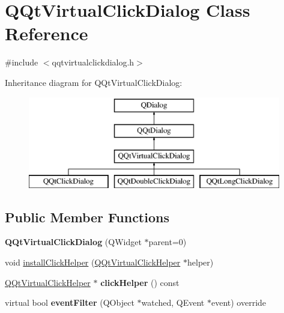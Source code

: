 \hypertarget{class_q_qt_virtual_click_dialog}{}\section{Q\+Qt\+Virtual\+Click\+Dialog Class Reference}
\label{class_q_qt_virtual_click_dialog}


{\ttfamily \#include $<$qqtvirtualclickdialog.\+h$>$}

Inheritance diagram for Q\+Qt\+Virtual\+Click\+Dialog\+:\begin{figure}[H]
\begin{center}
\leavevmode
\includegraphics[height=4.000000cm]{class_q_qt_virtual_click_dialog}
\end{center}
\end{figure}
\subsection*{Public Member Functions}
\begin{DoxyCompactItemize}
\item 
\mbox{\label{class_q_qt_virtual_click_dialog_ab93217aff56d096b6779de7e2f220e0f}} 
{\bfseries Q\+Qt\+Virtual\+Click\+Dialog} (Q\+Widget $\ast$parent=0)
\item 
void \mbox{\hyperlink{class_q_qt_virtual_click_dialog_ade58d6bdc539c61304628a9710c4e8b3}{install\+Click\+Helper}} (\mbox{\hyperlink{class_q_qt_virtual_click_helper}{Q\+Qt\+Virtual\+Click\+Helper}} $\ast$helper)
\item 
\mbox{\label{class_q_qt_virtual_click_dialog_a1fb81217557c85d8ce5974571ff49dcd}} 
\mbox{\hyperlink{class_q_qt_virtual_click_helper}{Q\+Qt\+Virtual\+Click\+Helper}} $\ast$ {\bfseries click\+Helper} () const
\item 
\mbox{\label{class_q_qt_virtual_click_dialog_a0b88feb5d4eb8189379524105fc62ef4}} 
virtual bool {\bfseries event\+Filter} (Q\+Object $\ast$watched, Q\+Event $\ast$event) override
\end{DoxyCompactItemize}
